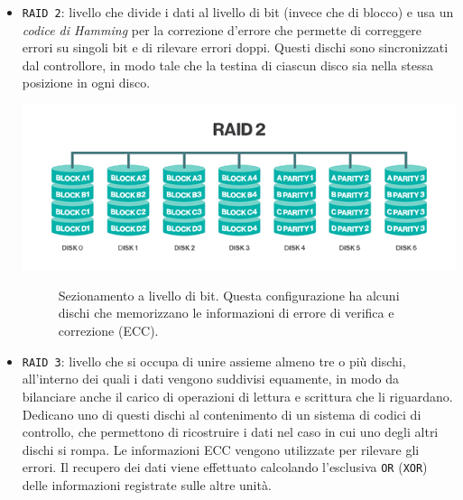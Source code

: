 \begin{itemize}
\item
\verb"RAID 2": livello che divide i dati al livello di bit (invece che di blocco) e usa un \textit{codice di Hamming} per la correzione d'errore che permette di correggere errori su singoli bit e di rilevare errori doppi. Questi dischi sono sincronizzati dal controllore, in modo tale che la testina di ciascun disco sia nella stessa posizione in ogni disco.\cite{etichetta10}\\

\begin{center}
\includegraphics[scale=0.60]{img/raid22.png}
\end{center}
\begin{figure}[htbp]
\caption{Sezionamento a livello di bit. Questa configurazione ha alcuni dischi che memorizzano le informazioni di errore di verifica e correzione (ECC).\label{figura1.6} \cite{etichetta9}}
\end{figure}

\item
\verb"RAID 3": livello che si occupa di unire assieme almeno tre o pi\`{u} dischi, all'interno dei quali i dati vengono suddivisi equamente, in modo da bilanciare anche il carico di operazioni di lettura e scrittura che li riguardano. Dedicano uno di questi dischi al contenimento di un sistema di codici di controllo, che permettono di ricostruire i dati nel caso in cui uno degli altri dischi si rompa. Le informazioni ECC vengono utilizzate per rilevare gli errori. Il recupero dei dati viene effettuato calcolando l'esclusiva \verb"OR" (\verb"XOR") delle informazioni registrate sulle altre unit\`{a}.\cite{etichetta9}\\ 


\end{itemize}
